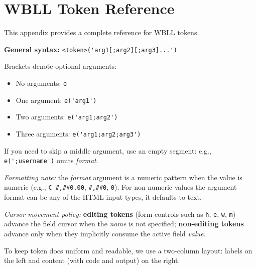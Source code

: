 
\chapter{WBLL Token Reference}
\label{app:wbll-tokens}

This appendix provides a complete reference for WBLL tokens.

\newcommand{\wballsyn}[1]{\lstinline[language=WBLL,basicstyle=\ttfamily\small]!#1!}

\noindent\textbf{General syntax:} \wballsyn{<token>('arg1[;arg2][;arg3]...')}

\noindent Brackets denote optional arguments:
\begin{itemize}
  \item No arguments: \wballsyn{e}
  \item One argument: \wballsyn{e('arg1')}
  \item Two arguments: \wballsyn{e('arg1;arg2')}
  \item Three arguments: \wballsyn{e('arg1;arg2;arg3')}
\end{itemize}
If you need to skip a middle argument, use an empty segment: e.g., \wballsyn{e(';username')} omits \textit{format}.

\par\smallskip
\textit{Formatting note:} the \textit{format} argument is a numeric pattern when the value is numeric (e.g., \texttt{€ \#,\#\#0.00}, \texttt{\#,\#\#0}, \texttt{0}). For non numeric values the argument format can be any of the HTML input types, it defaults to text.
\par\smallskip
\textit{Cursor movement policy:} \textbf{editing tokens} (form controls such as \texttt{h}, \texttt{e}, \texttt{w}, \texttt{m}) advance the field cursor when the \emph{name} is not specified; \textbf{non-editing tokens} advance only when they implicitly consume the active field \emph{value}.

To keep token docs uniform and readable, we use a two-column layout: labels on the left and content (with code and output) on the right.


